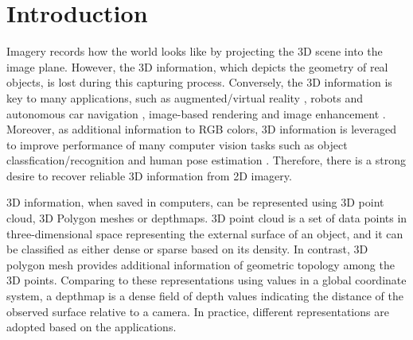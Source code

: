 \chapter{Introduction}


Imagery records how the world looks like by projecting the 3D scene into the image plane. 
However, the 3D information, which depicts the geometry of real objects, is lost during this capturing process. Conversely, the 3D information is key to many applications, such as augmented/virtual reality \cite{ventura2008depth}, robots and autonomous car navigation \cite{endres2012evaluation}, image-based rendering \cite{View_interpolation1993} and image enhancement \cite{zhang2014personal}. 
Moreover, as additional information to RGB colors, 3D information is leveraged to improve performance of many computer vision tasks such as object classfication/recognition \cite{gupta2013perceptual}  and human pose estimation \cite{CVPR_kinect}. Therefore, there is a strong desire to recover reliable 3D information from 2D imagery.

3D information, when saved in computers, can be represented using 3D point cloud, 3D Polygon meshes or depthmaps. 3D point cloud is a set of data points in three-dimensional space representing the external surface of an object, and it can be classified as either dense or sparse based on its density. In contrast, 3D polygon mesh provides additional information of geometric topology among the 3D points. Comparing to these representations using values in a global coordinate system, a depthmap is a dense field of depth values indicating the distance of the observed surface relative to a camera. In practice, different representations are adopted based on the applications. 

